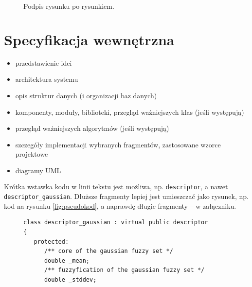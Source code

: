 \documentclass[a4paper,twoside,12pt]{book}
\begin{document}
{{\begin{figure}
\centering
{}
\caption{Podpis rysunku po rysunkiem.}
\label{fig:2}
\end{figure}

 

\chapter{Specyfikacja wewnętrzna}


 
\begin{itemize}
\item przedstawienie idei
\item architektura systemu
\item opis struktur danych (i organizacji baz danych)
\item komponenty, moduły, biblioteki, przegląd ważniejszych klas (jeśli występują)
\item przegląd ważniejszych algorytmów (jeśli występują)
\item szczegóły implementacji wybranych fragmentów, zastosowane wzorce projektowe
\item diagramy UML
\end{itemize}



Krótka wstawka kodu w linii tekstu jest możliwa, np. \lstinline|descriptor|, a nawet \lstinline|descriptor_gaussian|. 
Dłuższe fragmenty lepiej jest umieszczać jako rysunek, np. kod na rysunku \ref{fig:pseudokod}, a naprawdę długie fragmenty – w załączniku.

\begin{figure}
\centering
\begin{lstlisting}
class descriptor_gaussian : virtual public descriptor
{
   protected:
      /** core of the gaussian fuzzy set */
      double _mean;
      /** fuzzyfication of the gaussian fuzzy set */
      double _stddev;
      

\end{lstlisting}
\end{figure}}}
\end{document}
